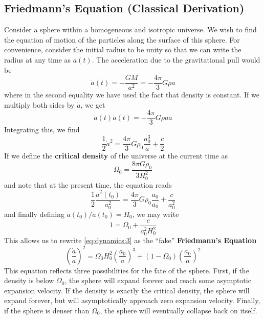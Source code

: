 \documentclass[10pt]{article}
\numberwithin{equation}{section}
\begin{document}
	\subsection{Friedmann's Equation (Classical Derivation)} %
	\label{sub:friedmann_s_equation_classical_derivation_}
		Consider a sphere within a homogeneous and isotropic universe. We wish to find the equation of motion of the particles along the surface of this sphere. For convenience, consider the initial radius to be unity so that we can write the radius at any time as $a(t)$. The acceleration due to the gravitational pull would be
		\begin{equation}
			\label{eq:dynamics:1} \ddot{a}(t) = -\frac{GM}{a^2}=-\frac{4\pi}{3}G\rho a
		\end{equation}
		where in the second equality we have used the fact that density is constant. If we multiply both sides by $\dot{a}$, we get
		\begin{equation}
			\label{eq:dynamics:2} \ddot{a}(t)\dot{a}(t) = -\frac{4\pi}{3}G\rho a \dot{a}
		\end{equation}
		Integrating this, we find
		\begin{equation}
			\label{eq:dynamics:3} \frac{1}{2}\dot{a}^2=\frac{4\pi}{3}G\rho_0\frac{a_0^3}{a}+\frac{c}{2}
		\end{equation}
		If we define the \textbf{critical density} of the universe at the current time as
		\begin{equation}
			\label{eq:dynamics:4} \Omega_0=\frac{8\pi G \rho_0}{3H_0^2}
		\end{equation}
		and note that at the present time, the equation reads
		\begin{equation}
			\label{eq:dynamics:5} \frac{1}{2}\frac{\dot{a}^2(t_0)}{a_0^2} = \frac{4\pi}{3}G\rho_0\frac{a_0}{a_0} + \frac{c}{a_0^2}
		\end{equation}
		and finally defining $\dot{a}(t_0)/a(t_0)=H_0$, we may write
		\begin{equation}
			\label{eq:dynamics:6} 1 = \Omega_0 + \frac{c}{a_0^2H_0^2}
		\end{equation}
		This allows us to rewrite \eqref{eq:dynamics:3} as the ``fake'' \textbf{Friedmann's Equation}
		\begin{equation}
			\label{eq:dynamics:7} \left(\frac{\dot{a}}{a}\right)^2 = \Omega_0 H_0^2\left(\frac{a_0}{a}\right)^3+(1-\Omega_0)\left(\frac{a_0}{a}\right)^2
		\end{equation}
		This equation reflects three possibilities for the fate of the sphere. First, if the density is below $\Omega_0$, the sphere will expand forever and reach some asymptotic expansion velocity. If the density is exactly the critical density, the sphere will expand forever, but will asymptotically approach zero expansion velocity. Finally, if the sphere is denser than $\Omega_0$, the sphere will eventually collapse back on itself.\\
		
\end{document}

